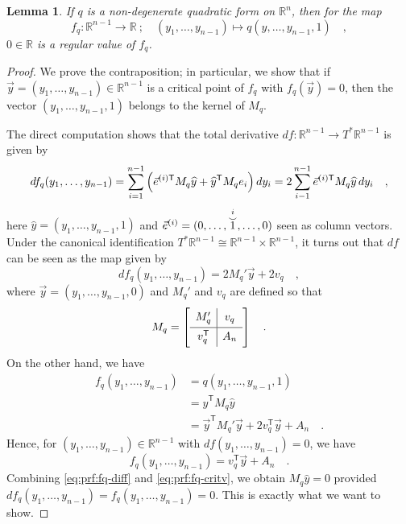 \documentclass[pdftex,a4paper,12pt]{scrartcl}
\theoremstyle{plain}
\newtheorem{lemma}[theorem]{Lemma}
\theoremstyle{definition}
\theoremstyle{remark}
\numberwithin{equation}{section}
\begin{document}
\begin{lemma}
If $q$ is a non-degenerate quadratic form on $\mathbb R^n$, then for the map
\[
f_q:\mathbb R^{n-1}\to\mathbb R\ ;\quad (y_1,\dots,y_{n-1}) \mapsto q(y,\dots ,y_{n-1},1)
\quad,
\]
$0\in\mathbb R$ is a regular value of $f_q$.
\end{lemma}
\begin{proof}
We prove the contraposition; in particular, we show that if $\vec y=(y_1,\dots,y_{n-1})\in\mathbb R^{n-1}$ is a critical point of $f_q$ with $f_q(\vec y)=0$, then the vector $(y_1,\dots,y_{n-1},1)$ belongs to the kernel of $M_q$.

The direct computation shows that the total derivative $df:\mathbb R^{n-1}\to T^\ast\mathbb R^{n-1}$ is given by
\[
df_q(y_1,\dots,y_{n-1})
= \sum_{i=1}^{n-1}\left(\vec e^{(i)\mathsf T} M_q\widehat y+\widehat y^{\mathsf T} M_q e_i\right) dy_i \\
= 2 \sum_{i-1}^{n-1} \vec e^{(i)\mathsf T}M_q\widehat y\, dy_i
\quad,
\]
here $\widehat y=(y_1,\dots,y_{n-1},1)$ and $\vec e^{(i)}=(0,\dots,\overset{\substack{i\\\smash\smile}}{1},\dots,0)$ seen as column vectors.
Under the canonical identification $T^\ast\mathbb R^{n-1}\cong \mathbb R^{n-1}\times\mathbb R^{n-1}$, it turns out that $df$ can be seen as the map given by
\begin{equation}
\label{eq:prf:fq-diff}
df_q(y_1,\dots,y_{n-1})
= 2M_q'\vec y+ 2v_q
\quad,
\end{equation}
where $\vec y=(y_1,\dots,y_{n-1},0)$ and $M_q'$ and $v_q$ are defined so that
\[
M_q =
\left[
\begin{array}{c|c}
  M_q' & v_q  \rule[-1.5ex]{0pt}{4ex}\\\hline\rule[-1.5ex]{0pt}{4ex}
  v_q^{\mathsf T} & A_n
\end{array}
\right]
\quad.
\]
On the other hand, we have
\[
\begin{split}
f_q(y_1,\dots,y_{n-1})
&= q(y_1,\dots,y_{n-1},1) \\
&= \widehat y^{\mathsf T} M_q\widehat y \\
&= \vec y^{\mathsf T} M_q'\vec y + 2v_q^{\mathsf T}\vec y + A_n
\quad.
\end{split}
\]
Hence, for $(y_1,\dots,y_{n-1})\in\mathbb R^{n-1}$ with $df(y_1,\dots,y_{n-1})=0$, we have
\begin{equation}
\label{eq:prf:fq-critv}
f_q(y_1,\dots,y_{n-1})
= v_q^{\mathsf T}\vec y + A_n
\quad.
\end{equation}
Combining \eqref{eq:prf:fq-diff} and \eqref{eq:prf:fq-critv}, we obtain $M_q\widehat y=0$ provided $df_q(y_1,\dots,y_{n-1})=f_q(y_1,\dots,y_{n-1})=0$.
This is exactly what we want to show.
\end{proof}
\end{document}
